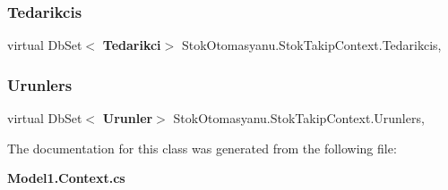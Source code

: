\mbox{\label{class_stok_otomasyanu_1_1_stok_takip_context_a49531929d71774b4aaafc390002765cd}} 
\subsubsection{Tedarikcis}
{\footnotesize\ttfamily virtual Db\+Set$<$\textbf{ Tedarikci}$>$ Stok\+Otomasyanu.\+Stok\+Takip\+Context.\+Tedarikcis\hspace{0.3cm}{\ttfamily [get]}, {\ttfamily [set]}}

\mbox{\label{class_stok_otomasyanu_1_1_stok_takip_context_acdfad849fe1288813679eff37ad7da7f}} 
\subsubsection{Urunlers}
{\footnotesize\ttfamily virtual Db\+Set$<$\textbf{ Urunler}$>$ Stok\+Otomasyanu.\+Stok\+Takip\+Context.\+Urunlers\hspace{0.3cm}{\ttfamily [get]}, {\ttfamily [set]}}



The documentation for this class was generated from the following file\+:\begin{DoxyCompactItemize}
\item 
\textbf{ Model1.\+Context.\+cs}\end{DoxyCompactItemize}
